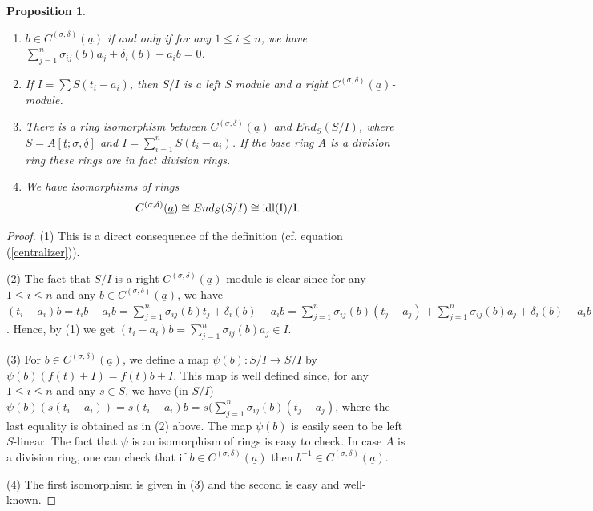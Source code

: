 \documentclass[12pt,a4paper]{article}
\newtheorem{proposition}[theorem]{Proposition}
\newcommand{\ut}{\underline{t}}
\newcommand{\ua}{\underline{a}}
\newcommand{\ud}{\underline{\delta}}
\begin{document}
	\begin{proposition} \label{Pro for centralizer}
		
		\begin{enumerate}
			\item[(1)] $b\in C^{(\sigma,\delta)}(\ua)$ if and only if for any $1\le i \le n$, we have $\sum_{j=1}^n\sigma_{ij}(b)a_j+\delta_i(b)-a_ib=0$.
			\item[(2)] If $I=\sum S(t_i-a_i)$, then $S/I$ is a left $S$ module and a right $C^{(\sigma,\delta)}(\ua)$- module.
			\item[(3)] There is a ring isomorphism between $C^{(\sigma,\delta)}(\ua)$ and $End_S(S/I)$, where $S=A[\ut;\sigma,\ud]$ and $I=\sum_{i=1}^nS(t_i-a_i)$.  If the base ring $A$ is a division ring these rings are in fact division rings.
			\item[(4)] We have isomorphisms of rings 
			$$
			C^{(\sigma,\delta)}(\ua)\cong End_S(S/I) \cong 
			\rm{idl}(I)/I.
			$$
 		\end{enumerate}
		
	\end{proposition}
	\begin{proof}
		(1) This is a direct consequence of the definition (cf. equation (\ref{centralizer})).
		
		(2) The fact that $S/I$ is a right $C^{(\sigma,\delta)}(\ua)$-module is clear since 
		for any $1\le i \le n$ and any $b\in C^{(\sigma,\delta)}(\ua)$, we have $(t_i-a_i)b=t_ib-a_ib=\sum_{j=1}^n\sigma_{ij}(b)t_j+\delta_i(b)-a_ib=\sum_{j=1}^n\sigma_{ij}(b)(t_j-a_j)+\sum_{j=1}^n\sigma_{ij}(b)a_j+\delta_i(b)-a_ib$.  Hence, by (1) we get $(t_i-a_i)b = \sum_{j=1}^n\sigma_{ij}(b)a_j\in I$.
		
		(3) For $b\in C^{(\sigma,\delta)}(\ua)$,  we define a map $\psi(b):S/I \rightarrow S/I$ by $\psi(b)(f(t)+I)=f(t)b+I$.  This map is well defined since, for any $1\le i \le n$ and any $s\in S$, we have (in $S/I$) $\psi(b)(s(t_i-a_i))=s(t_i-a_i)b=
		s(\sum_{j=1}^n\sigma_{ij}(b)(t_j-a_j)$, where the last equality is obtained as in (2) above.  The map $\psi(b)$ is easily seen to be left $S$-linear. The fact that $\psi$ is an isomorphism of rings is easy to check.  In case $A$ is a division ring, one can check that if $b\in C^{(\sigma,\delta)}(\ua)$ then $b^{-1}\in C^{(\sigma,\delta)}(\ua)$. 
		
		(4) The first isomorphism is given in (3) and the second is easy and well-known. 
	\end{proof}
	
\end{document}
